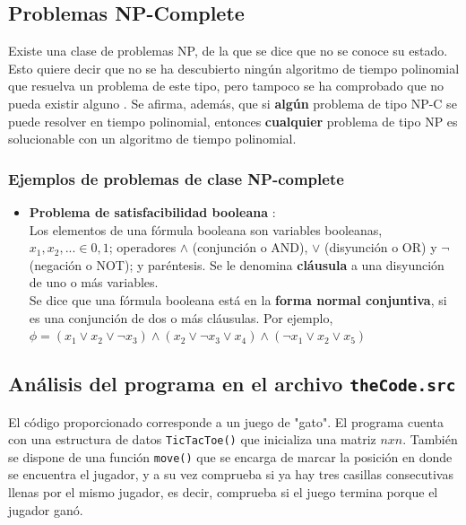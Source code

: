 \subsection{Problemas NP-Complete}

Existe una clase de problemas NP, de la que se dice que no se conoce su estado. Esto quiere decir que no se ha descubierto ningún algoritmo de tiempo polinomial que resuelva un problema de este tipo, pero tampoco se ha comprobado que no pueda existir alguno \cite{R5}. Se afirma, además, que si \textbf{algún} problema de tipo NP-C se puede resolver en tiempo polinomial, entonces \textbf{cualquier} problema de tipo NP es solucionable con un algoritmo de tiempo polinomial.

\subsubsection{Ejemplos de problemas de clase NP-complete}
\begin{itemize}
    \item \textbf{Problema de satisfacibilidad booleana} \cite{R7}: \\
    Los elementos de una fórmula booleana son variables booleanas, $x_1,x_2,...\in{0,1}$; operadores $\wedge$ (conjunción o AND), $\vee$ (disyunción o OR) y $\neg$ (negación o NOT); y paréntesis. Se le denomina \textbf{cláusula} a una disyunción de uno o más variables.\\
    Se dice que una fórmula booleana está en la \textbf{forma normal conjuntiva}, si es una conjunción de dos o más cláusulas. Por ejemplo, $\phi = (x_1\vee x_2 \vee \neg x_3)\wedge(x_2\vee \neg x_3 \vee x_4) \wedge (\neg x_1 \vee x_2 \vee x_5)$
\end{itemize}

\subsection{Análisis del programa en el archivo \texttt{theCode.src}}

El código proporcionado corresponde a un juego de "gato". El programa cuenta con una estructura de datos \texttt{TicTacToe()} que inicializa una matriz $nxn$. También se dispone de una función \texttt{move()} que se encarga de marcar la posición en donde se encuentra el jugador, y a su vez comprueba si ya hay tres casillas consecutivas llenas por el mismo jugador, es decir, comprueba si el juego termina porque el jugador ganó.

